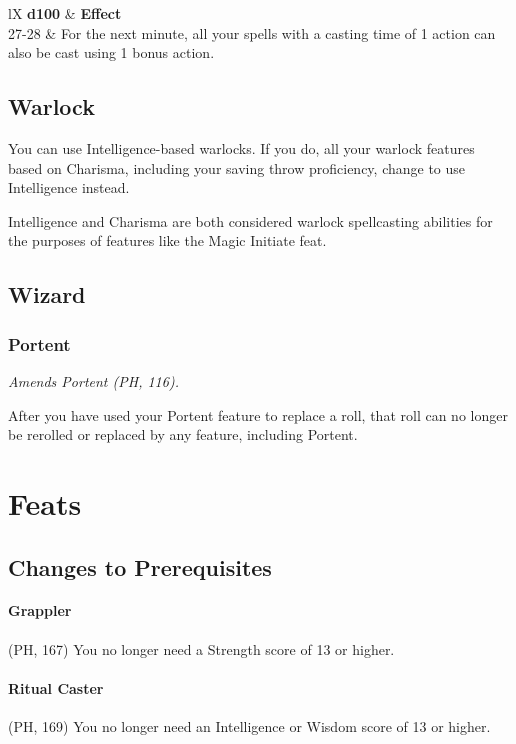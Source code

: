 \documentclass[House_Rules.tex]{subfiles}
\begin{document}
\begin{DndTable}[]{lX}
    \textbf{d100} & \textbf{Effect} \\
    27-28 & For the next minute, all your spells with a casting time of 1 action can also be cast using 1 bonus action.
\end{DndTable}

\subsection{Warlock}

You can use Intelligence-based warlocks. If you do, all your warlock features based on Charisma, including your saving throw proficiency, change to use Intelligence instead.

Intelligence and Charisma are both considered warlock spellcasting abilities for the purposes of features like the Magic Initiate feat.

\subsection{Wizard}

\subsubsection{Portent}
\textit{Amends Portent (PH, 116).}

After you have used your Portent feature to replace a roll, that roll can no longer be rerolled or replaced by any feature, including Portent.




\section{Feats}

\subsection{Changes to Prerequisites}

\paragraph{Grappler} (PH, 167) You no longer need a Strength score of 13 or higher.

\paragraph{Ritual Caster} (PH, 169) You no longer need an Intelligence or Wisdom score of 13 or higher.
\end{document}

